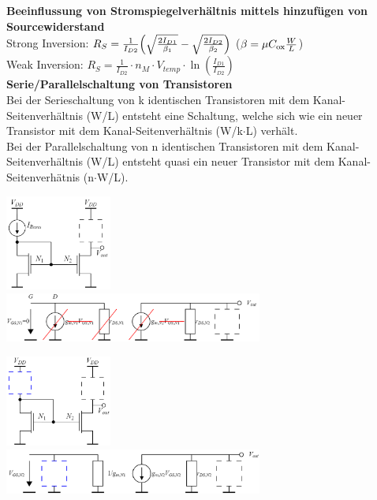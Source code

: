 \textbf{Beeinflussung von Stromspiegelverhältnis mittels hinzufügen von Sourcewiderstand} \\
Strong Inversion: $R_S=\frac{1}{I_{D2}} \Bigl(\sqrt{\frac{2I_{D1}}{\beta_1}} - \sqrt{\frac{2I_{D2}}{\beta_2}}\Bigr)$ \hspace{20pt}($\beta = \mu C_{\rm ox} \frac{W}{L}$)\\
Weak Inversion: $R_S = \frac{1}{I_{D2}}\cdot n_M\cdot V_{temp} \cdot \ln(\frac{I_{D1}}{I_{D2}})$\\
\textbf{Serie/Parallelschaltung von Transistoren} \\
Bei der Serieschaltung von k identischen Transistoren mit dem Kanal-Seitenverhältnis (W/L) entsteht eine Schaltung, welche sich wie ein neuer Transistor mit dem Kanal-Seitenverhältnis (W/k$\cdot$L) verhält. \\
Bei der Parallelschaltung von n identischen Transistoren mit dem Kanal-Seitenverhältnis (W/L) entsteht quasi ein neuer Transistor mit dem Kanal-Seitenverhätnis (n$\cdot$W/L).\\
\begin{minipage}{0.5\linewidth}
    \includegraphics[width=3.5cm]{Stromspiegel_mitStromquelle_GS.png}\\\includegraphics[width=8.5cm]{Stromspiegel_mitStromquelle_KS.png}
\end{minipage}%
\begin{minipage}{0.5\linewidth}
    \includegraphics[width=3.5cm]{Stromspiegel_ohneStromquelle_GS.png}\\\includegraphics[width=8.5cm]{Stromspiegel_ohneStromquelle_KS.png}
\end{minipage}
\newpage
